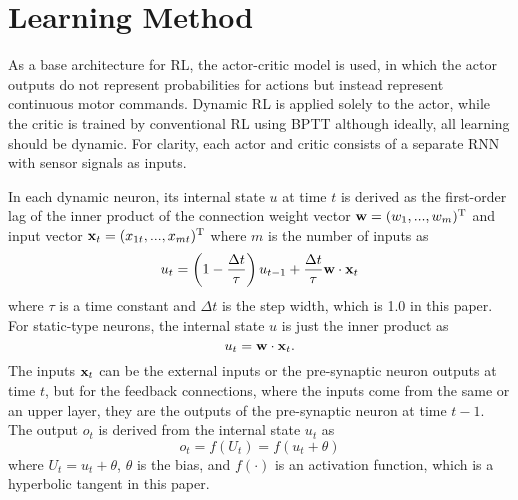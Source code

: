 \section{Learning Method}
As a base architecture for RL, the actor-critic model is used,
in which the actor outputs do not represent probabilities for actions
but instead represent continuous motor commands.
Dynamic RL is applied solely to the actor, while the critic is trained by conventional RL using BPTT \citep{PDP}
although ideally, all learning should be dynamic.
For clarity, each actor and critic consists of a separate RNN with sensor signals as inputs.

In each dynamic neuron, its internal state $u$ at time $t$ is derived
as the first-order lag of the inner product of the connection weight vector ${\bf w}=(w_1, ... , w_m)^\mathrm{T}$
and input vector ${\bf x}_t=(x_{1t}, ... , x_{mt})^\mathrm{T}$ where $m$ is the number of inputs as
\begin{equation}
u_t = \left(1-\frac{\Delta t}{\tau}\right)u_{t-1}+\frac{\Delta t}{\tau}{\bf w}\cdot{\bf x}_t
\label{Eq:internal_state}
\end{equation}
where $\tau$ is a time constant and $\Delta t$ is the step width, which is 1.0 in this paper.
For static-type neurons, the internal state $u$ is just the inner product as
\begin{equation}
u_t = {\bf w}\cdot{\bf x}_t.
\label{Eq:internal_state_static}
\end{equation}
The inputs ${\bf x}_t$ can be the external inputs or the pre-synaptic neuron outputs at time $t$,
but for the feedback connections, where the inputs come from the same or an upper layer,
they are the outputs of the pre-synaptic neuron at time $t-1$. 
The output $o_t$ is derived from the internal state $u_t$ as
\begin{equation}
o_t = f(U_t)=f(u_t+\theta)
\label{Eq:output}
\end{equation}
where $U_t=u_t+\theta$, $\theta$ is the bias, and $f(\cdot)$ is an activation function,
which is a hyperbolic tangent in this paper.

